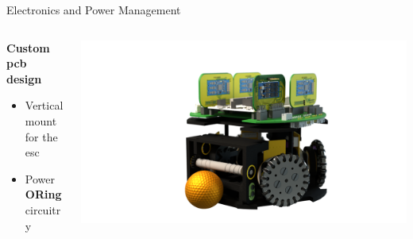 
\begin{frame}[plain]

	\begin{adjustbox}{scale=1,center,margin={0cm,0cm,0cm,0cm}}
	\end{adjustbox}

\end{frame}


\begin{frame}{Electronics and Power Management}
	\begin{columns}[T]
		\begin{column}{0.5\textwidth}
			\textbf{Custom \ac{pcb} design}
			\begin{itemize}
				\item Vertical mount for the \ac{esc}
				\item Power \textbf{ORing} circuitry
			\end{itemize}
		\end{column}
		\begin{column}{0.5\textwidth}
			\begin{adjustbox}{scale=2,center,margin={-1cm,3cm,2cm,0cm}}
				\includegraphics[width=\textwidth]{image/png/robot_base.png}
			\end{adjustbox}
		\end{column}
	\end{columns}
\end{frame}

